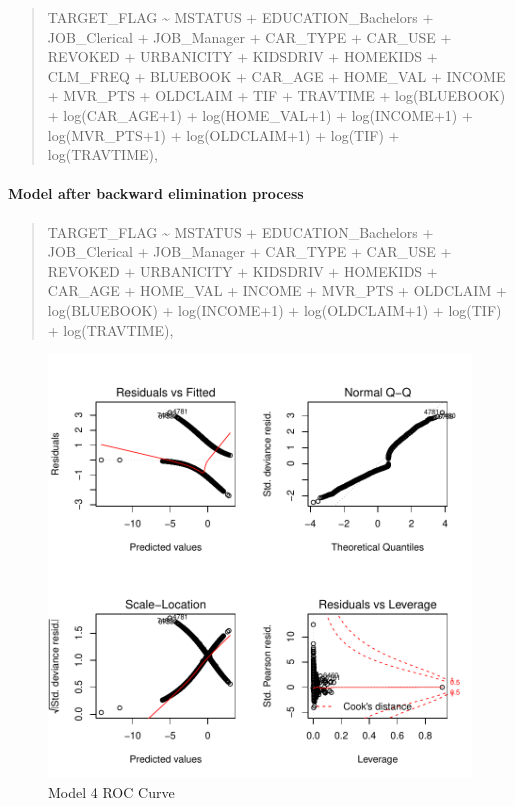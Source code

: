 \documentclass[]{article}
\let\oldparagraph\paragraph
\renewcommand{\paragraph}[1]{\oldparagraph{#1}\mbox{}}
\begin{document}
\begin{quote}
TARGET\_FLAG \textasciitilde{} MSTATUS + EDUCATION\_Bachelors +
JOB\_Clerical + JOB\_Manager + CAR\_TYPE + CAR\_USE + REVOKED +
URBANICITY + KIDSDRIV + HOMEKIDS + CLM\_FREQ + BLUEBOOK + CAR\_AGE +
HOME\_VAL + INCOME + MVR\_PTS + OLDCLAIM + TIF + TRAVTIME +
log(BLUEBOOK) + log(CAR\_AGE+1) + log(HOME\_VAL+1) + log(INCOME+1) +
log(MVR\_PTS+1) + log(OLDCLAIM+1) + log(TIF) + log(TRAVTIME),
\end{quote}

\paragraph{Model after backward elimination
process}\label{model-after-backward-elimination-process}

\begin{quote}
TARGET\_FLAG \textasciitilde{} MSTATUS + EDUCATION\_Bachelors +
JOB\_Clerical + JOB\_Manager + CAR\_TYPE + CAR\_USE + REVOKED +
URBANICITY + KIDSDRIV + HOMEKIDS + CAR\_AGE + HOME\_VAL + INCOME +
MVR\_PTS + OLDCLAIM + log(BLUEBOOK) + log(INCOME+1) + log(OLDCLAIM+1) +
log(TIF) + log(TRAVTIME),
\end{quote}

\begin{figure}
\centering
\includegraphics{proj4_files/figure-latex/f13-1.pdf}
\caption{\label{fig:f13}Model 4 ROC Curve}
\end{figure}
\end{document}

